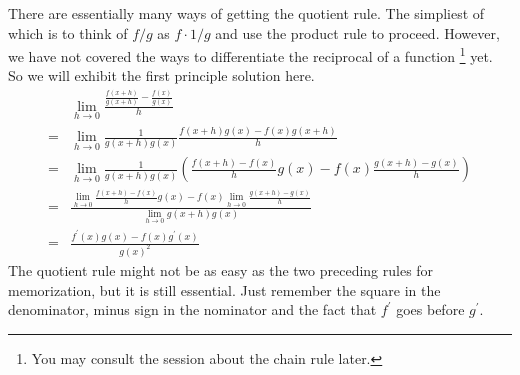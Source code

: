 There are essentially many ways of getting the quotient rule.
The simpliest of which is to think of $f/g$ as $f\cdot 1/g$ and use the product rule to proceed.
However, we have not covered the ways to differentiate the reciprocal of a function
\footnote{You may consult the session about the chain rule later.}
yet.
So we will exhibit the first principle solution here.
\begin{align*}
    &\lim_{h\to0}\frac{\frac{f(x+h)}{g(x+h)}-\frac{f(x)}{g(x)}}{h}\\
    =&\lim_{h\to0}\frac{1}{g(x+h)g(x)}\frac{f(x+h)g(x)-f(x)g(x+h)}{h}\\
    =&\lim_{h\to0}\frac{1}{g(x+h)g(x)}
    \left(\frac{f(x+h)-f(x)}{h}g(x)-f(x)\frac{g(x+h)-g(x)}{h}\right)\\
    =&\frac{\lim_{h\to0}\frac{f(x+h)-f(x)}{h}g(x)-f(x)\lim_{h\to0}\frac{g(x+h)-g(x)}{h}}{\lim_{h\to0}g(x+h)g(x)}\\
    =&\frac{f^\prime(x)g(x)-f(x)g^\prime(x)}{g(x)^2}
\end{align*}
The quotient rule might not be as easy as the two preceding rules for memorization, but it is still essential.
Just remember the square in the denominator, minus sign in the nominator and the fact that $f^\prime$ goes before $g^\prime$.